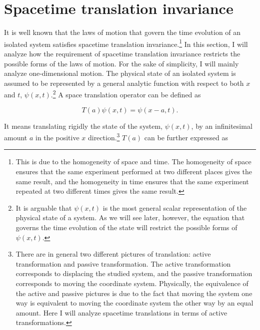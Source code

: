 
\section{Spacetime translation invariance}

It is well known that the laws of motion that govern the time evolution of an isolated system satisfies spacetime translation invariance.\footnote{This is due to the homogeneity of space and time. The homogeneity of space ensures that the same experiment performed at two different places gives the same result, and the homogeneity in time ensures that the same experiment repeated at two different times gives the same result.} 
In this section, I will analyze how the requirement of spacetime translation invariance restricts the possible forms of the laws of motion. For the sake of simplicity, I will mainly analyze one-dimensional motion.
The physical state of an isolated system is assumed to be represented by a general analytic function with respect to both $x$ and $t$, $\psi(x,t)$.\footnote{It is arguable that $\psi(x,t)$ is the most general scalar representation of the physical state of a system. As we will see later, however, the equation that governs the time evolution of the state will restrict the possible forms of $\psi(x,t)$.} A space translation operator can be defined as 

\begin{equation}
T(a)\psi(x,t)=\psi(x-a,t).
\label{}
\end{equation}

\noindent It means translating rigidly the state of the system, $\psi(x,t)$, by an infinitesimal amount $a$ in the positive $x$ direction.\footnote{There are in general two different pictures of translation: active transformation and passive transformation. The active transformation corresponds to displacing the studied system, and the passive transformation corresponds to moving the coordinate system. Physically, the equivalence of the active and passive pictures is due to the fact that moving the system one way is equivalent to moving the coordinate system the other way by an equal amount. Here I will analyze spacetime translations in terms of active transformations.} $T(a)$ can be further expressed as 

